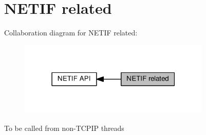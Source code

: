 \hypertarget{group__netifapi__netif}{}\section{N\+E\+T\+IF related}
\label{group__netifapi__netif}
Collaboration diagram for N\+E\+T\+IF related\+:
\nopagebreak
\begin{figure}[H]
\begin{center}
\leavevmode
\includegraphics[width=259pt]{group__netifapi__netif}
\end{center}
\end{figure}
To be called from non-\/\+T\+C\+P\+IP threads 